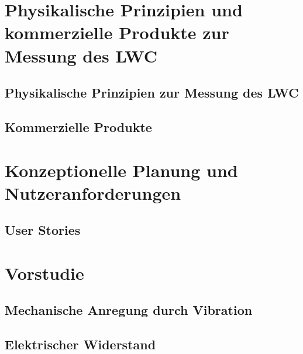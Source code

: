 \documentclass[a4paper,12pt]{article}
\begin{document}
\section{Physikalische Prinzipien und kommerzielle Produkte zur Messung des LWC}




\subsection{Physikalische Prinzipien zur Messung des LWC}


\subsection{Kommerzielle Produkte}


\section{Konzeptionelle Planung und Nutzeranforderungen}
\subsection{User Stories}



\newpage
\section{Vorstudie}


\subsection{Mechanische Anregung durch Vibration}
\label{sec:Vibr}


\newpage
\subsection{Elektrischer Widerstand}
\label{sec:Volt}

\end{document}
